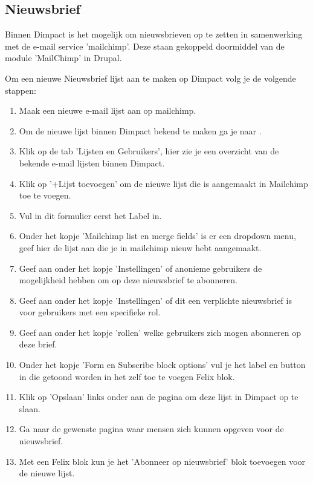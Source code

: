 \subsection{Nieuwsbrief}\label{nieuwsbrief}

Binnen Dimpact is het mogelijk om nieuwsbrieven op te zetten in samenwerking met de e-mail service 'mailchimp'. Deze staan gekoppeld doormiddel van de module 'MailChimp' in Drupal.

Om een nieuwe Nieuwsbrief lijst aan te maken op Dimpact volg je de volgende stappen:
\begin{enumerate}
  \item Maak een nieuwe e-mail lijst aan op mailchimp. 
  \item Om de nieuwe lijst binnen Dimpact bekend te maken ga je naar .
  \item Klik op de tab 'Lijsten en Gebruikers', hier zie je een overzicht van de bekende e-mail lijsten binnen Dimpact.
  \item Klik op '+Lijst toevoegen' om de nieuwe lijst die is aangemaakt in Mailchimp toe te voegen.
  \item Vul in dit formulier eerst het Label in.
  \item Onder het kopje 'Mailchimp list en merge fields' is er een dropdown menu, geef hier de lijst aan die je in mailchimp nieuw hebt aangemaakt.
  \item Geef aan onder het kopje 'Instellingen' of anonieme gebruikers de mogelijkheid hebben om op deze nieuwsbrief te abonneren.
  \item Geef aan onder het kopje 'Instellingen' of dit een verplichte nieuwsbrief is voor gebruikers met een specifieke rol.
  \item Geef aan onder het kopje 'rollen' welke gebruikers zich mogen abonneren op deze brief.
  \item Onder het kopje 'Form en Subscribe block options' vul je het label en button in die getoond worden in het zelf toe te voegen Felix blok. 
  \item Klik op 'Opslaan' links onder aan de pagina om deze lijst in Dimpact op te slaan.
  \item Ga naar de gewenste pagina waar mensen zich kunnen opgeven voor de nieuwsbrief.
  \item Met een Felix blok kun je het 'Abonneer op nieuwsbrief' blok toevoegen voor de nieuwe lijst.
\end{enumerate}